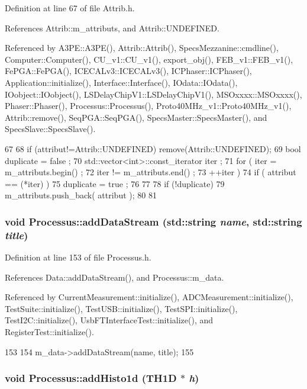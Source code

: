 Definition at line 67 of file Attrib.h.

References Attrib::m\_\-attributs, and Attrib::UNDEFINED.

Referenced by A3PE::A3PE(), Attrib::Attrib(), SpecsMezzanine::cmdline(), Computer::Computer(), CU\_\-v1::CU\_\-v1(), export\_\-obj(), FEB\_\-v1::FEB\_\-v1(), FePGA::FePGA(), ICECALv3::ICECALv3(), ICPhaser::ICPhaser(), Application::initialize(), Interface::Interface(), IOdata::IOdata(), IOobject::IOobject(), LSDelayChipV1::LSDelayChipV1(), MSOxxxx::MSOxxxx(), Phaser::Phaser(), Processus::Processus(), Proto40MHz\_\-v1::Proto40MHz\_\-v1(), Attrib::remove(), SeqPGA::SeqPGA(), SpecsMaster::SpecsMaster(), and SpecsSlave::SpecsSlave().


\begin{DoxyCode}
67                             {
68     if (attribut!=Attrib::UNDEFINED) remove(Attrib::UNDEFINED);
69     bool duplicate = false ;
70     std::vector<int>::const_iterator iter ;
71     for ( iter  = m_attributs.begin() ;
72           iter != m_attributs.end()   ;
73           ++iter ) {
74       if ( attribut == (*iter) ) {
75         duplicate = true ;
76       }
77     }
78     if (!duplicate) {
79       m_attributs.push_back( attribut );
80     }
81   }
\end{DoxyCode}
\hypertarget{classProcessus_a308c8f193802f1d1ab49d4447d0cb281}{
\subsubsection[{addDataStream}]{\setlength{\rightskip}{0pt plus 5cm}void Processus::addDataStream (std::string {\em name}, \/  std::string {\em title})}}
\label{classProcessus_a308c8f193802f1d1ab49d4447d0cb281}


Definition at line 153 of file Processus.h.

References Data::addDataStream(), and Processus::m\_\-data.

Referenced by CurrentMeasurement::initialize(), ADCMeasurement::initialize(), TestSuite::initialize(), TestUSB::initialize(), TestSPI::initialize(), TestI2C::initialize(), UsbFTInterfaceTest::initialize(), and RegisterTest::initialize().


\begin{DoxyCode}
153                                                        {
154     m_data->addDataStream(name, title);
155   }
\end{DoxyCode}
\hypertarget{classProcessus_ad46e0d4dfdfdcbce001ee6be1746dfa4}{
\subsubsection[{addHisto1d}]{\setlength{\rightskip}{0pt plus 5cm}void Processus::addHisto1d (TH1D $\ast$ {\em h})}}
\label{classProcessus_ad46e0d4dfdfdcbce001ee6be1746dfa4}


